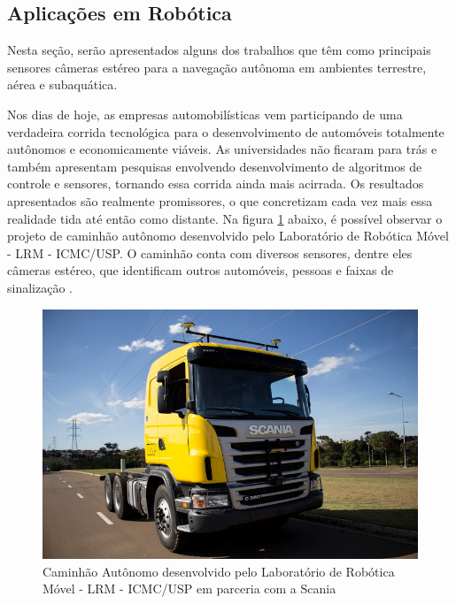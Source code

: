
\subsection{Aplicações em Robótica}
\label{aplicacoes_robotica}
Nesta seção, serão apresentados alguns dos trabalhos que têm como principais sensores câmeras estéreo para a navegação autônoma em ambientes terrestre, aérea e subaquática.

Nos dias de hoje, as empresas automobilísticas vem participando de uma verdadeira corrida tecnológica para o desenvolvimento de automóveis totalmente autônomos e economicamente viáveis. As universidades não ficaram para trás e também apresentam pesquisas envolvendo desenvolvimento de algoritmos de controle e sensores, tornando essa corrida ainda mais acirrada. Os resultados apresentados são realmente promissores, o que concretizam cada vez mais essa realidade tida até então como distante. Na figura \ref{caminhao_autonomo} abaixo, é possível observar o projeto de caminhão autônomo desenvolvido pelo Laboratório de Robótica Móvel - LRM - ICMC/USP. O caminhão conta com diversos sensores, dentre eles câmeras estéreo, que identificam outros automóveis, pessoas e faixas de sinalização \cite{ShinzatoP}. 

\begin{figure}[H]
 	\centering
 	\includegraphics[scale=0.35]{./Resources/caminhao_autonomo.jpg}
 	\caption{Caminhão Autônomo desenvolvido pelo Laboratório de Robótica Móvel - LRM - ICMC/USP em parceria com a Scania}
 	\label{caminhao_autonomo}
\end{figure}

